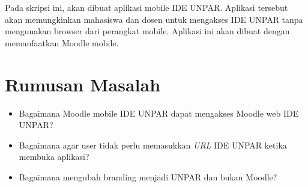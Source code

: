 \documentclass[a4paper,twoside]{article}
\begin{document}
Pada skripsi ini, akan dibuat aplikasi mobile IDE UNPAR. Aplikasi tersebut akan memungkinkan mahasiswa dan dosen untuk mengakses IDE UNPAR tanpa mengunakan browser dari perangkat mobile. Aplikasi ini akan dibuat dengan memanfaatkan Moodle mobile. 







\section{Rumusan Masalah}
\begin{itemize}
	\item Bagaimana Moodle mobile IDE UNPAR dapat mengakses Moodle web IDE UNPAR?
	\item Bagaimana agar user tidak perlu memasukkan \textit{URL} IDE UNPAR ketika membuka aplikasi?
	\item Bagaimana mengubah branding menjadi UNPAR dan bukan Moodle?
\end{itemize}
\end{document}
